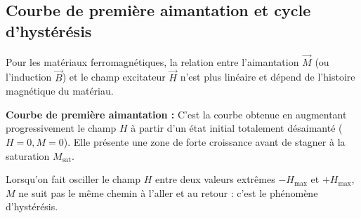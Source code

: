 \documentclass[french]{yLectureNote}
\renewcommand{\vec}{\overrightarrow}
\begin{document}


\subsection{Courbe de première aimantation et cycle d'hystérésis}

Pour les matériaux ferromagnétiques, la relation entre l'aimantation $\vec{M}$ (ou l'induction $\vec{B}$) et le champ excitateur $\vec{H}$ n'est plus linéaire et dépend de l'histoire magnétique du matériau.

\begin{definition}
    \textbf{Courbe de première aimantation :} C'est la courbe obtenue en augmentant progressivement le champ $H$ à partir d'un état initial totalement désaimanté ($H=0, M=0$). Elle présente une zone de forte croissance avant de stagner à la saturation $M_{\text{sat}}$.
\end{definition}

Lorsqu'on fait osciller le champ $H$ entre deux valeurs extrêmes $-H_{\max}$ et $+H_{\max}$, $M$ ne suit pas le même chemin à l'aller et au retour : c'est le phénomène d'hystérésis.


\end{document}
